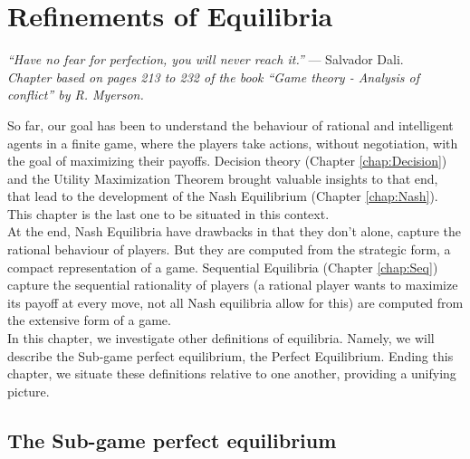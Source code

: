 \ifx \globalmark \undefined %

\else
\fi



\chapter{Refinements of Equilibria}
\label{chap:Refinements}
{\large{\itshape
``Have no fear for perfection, you will never reach it.''} --- Salvador Dali.\\}
  {\small{\itshape
Chapter based on pages 213 to 232 of the book  ``Game theory - Analysis of conflict'' by R. Myerson.}\\
}

So far, our goal has been to understand the behaviour of rational and intelligent agents in a finite game, where the players take actions, without negotiation, with the goal of maximizing their payoffs. Decision  theory (Chapter \ref{chap:Decision}) and the Utility Maximization Theorem brought  valuable insights to that end, that lead to the development of the Nash Equilibrium (Chapter \ref{chap:Nash}). This chapter is the last one to be situated in this context.\\
At the end, Nash Equilibria have drawbacks in that they don't alone, capture the rational behaviour of players. But they are computed from the strategic form, a compact representation of a game. Sequential Equilibria (Chapter \ref{chap:Seq}) capture the  sequential rationality of players (a rational player wants to maximize its payoff at every move, not all Nash equilibria allow for this) are computed from the extensive form of a game. \\
In this chapter, we investigate other definitions of equilibria. Namely, we will describe the Sub-game perfect equilibrium, the Perfect Equilibrium. Ending this chapter, we situate these definitions relative to one another, providing a unifying picture.
\section{The Sub-game perfect equilibrium}

